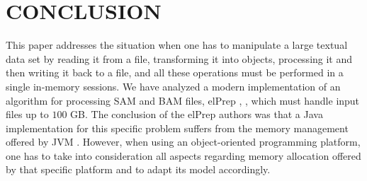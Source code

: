 \documentclass[a4paper,twoside]{article}
\begin{document}
%
%





\section{\uppercase{Conclusion}}
This paper addresses the situation when one has to manipulate a large textual data set by reading it from a file, transforming it into objects, processing it and then writing it back to a file, and all these operations must be performed in a single in-memory sessions.
We have analyzed a modern implementation of an algorithm for processing SAM and BAM files, elPrep \cite{herzeel:2015}, \cite{herzeel:2019}, which must handle input files up to $100$ GB.
The conclusion of the elPrep authors was that a Java implementation for this specific problem suffers from the memory management offered by JVM \cite{costanza:2019}.
However, when using an object-oriented programming platform, one has to take into consideration all aspects regarding memory allocation offered by that specific platform and to adapt its model accordingly. 
\end{document}
